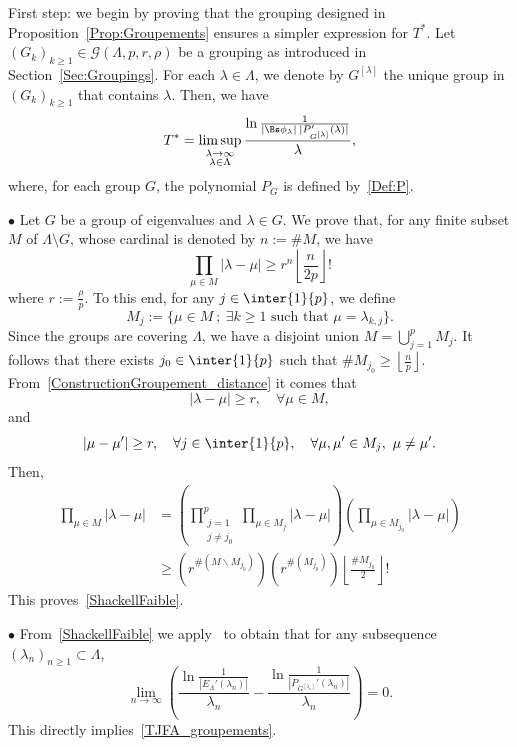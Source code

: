 \begin{proofc}
\begin{step}{First step:}
we begin by proving that the grouping designed in Proposition~\ref{Prop:Groupements} ensures a simpler expression for $T^*$. Let $(G_k)_{k \geq 1}\in \mathcal{G}(\Lambda,p,r,\rho)$ be a grouping as introduced in Section~\ref{Sec:Groupings}. For each $\lambda\in \Lambda$, we denote by $G^{[\lambda]}$ the unique group in $(G_k)_{k\geq 1}$ that contains $\lambda$. Then, we have
\begin{equation}\label{TJFA_groupements}
T^*=\limsup_{\substack{\lambda\to \infty\\ \lambda\in \Lambda}} \frac{\ln \frac{1}{| \Bs\phi_\lambda | \: | P_{G^{[\lambda]}}' (\lambda) |}}{ \lambda },
\end{equation}
where, for each group $G$, the polynomial $P_G$ is defined by~\eqref{Def:P}.


\noindent $\bullet$ Let $G$ be a group of eigenvalues and $\lambda \in G$. We prove that, for any finite subset $M$ of $\Lambda\setminus G$, whose cardinal is denoted by $n:=\# M$, we have
\begin{equation}\label{ShackellFaible}
\prod_{\mu \in M} |\lambda- \mu| \geq r^n \left\lfloor \frac{n}{2p} \right\rfloor !
\end{equation}
where $r:= \frac{\rho}{p}$. To this end, for any $j \in \inter{1}{p}$, we define
\[
M_j := \{ \mu\in M \: ; \: \exists k \geq 1 \text{ such that } \mu = \lambda_{k,j} \}.
\]
Since the groups are covering $\Lambda$, we have a disjoint union $M = \displaystyle\bigcup_{j=1}^p M_j$. It follows that there exists $j_0 \in \inter{1}{p}$ such that $\# M_{j_0} \geq \left\lfloor \frac{n}{p} \right\rfloor$. From~\eqref{ConstructionGroupement_distance} it comes that
\[
|\lambda - \mu | \geq r, \quad \forall \mu \in M,
\]
and
\[
|\mu - \mu'| \geq r, \quad \forall j \in \inter{1}{p},\quad\forall \mu, \mu' \in M_j, \ \mu\neq \mu'.
\]
Then,
\begin{align*}
\prod_{\mu \in M} |\lambda- \mu| &= \left(\prod_{\substack{j=1 \\ j \neq j_0}}^p \prod_{\mu \in M_j} |\lambda-\mu| \right) \left(\prod_{\mu \in M_{j_0}} |\lambda-\mu|\right)
\\
&\geq \left(r^{\# (M\backslash M_{j_0})} \right) \left(r^{\# (M_{j_0})}\right) \left\lfloor \frac{\#M_{j_0}}{2} \right\rfloor!
\end{align*}
This proves~\eqref{ShackellFaible}.

\medskip
\noindent $\bullet$ From~\eqref{ShackellFaible} we apply~\cite[Theorem~3.8]{AmmarKhodjaBenabdallahGonzalez-BurgosdeTeresa:2014} to obtain that for any subsequence $(\lambda_n)_{n \geq 1} \subset \Lambda$,
\begin{equation}\label{JFA_Th3.8}
\lim_{n \to \infty} \left(\frac{\ln \frac{1}{|E_\Lambda'(\lambda_n)|}}{\lambda_n} - \frac{\ln \frac{1}{|P_{G^{[\lambda_n]}}'(\lambda_n)|}}{\lambda_n} \right) = 0.
\end{equation}
This directly implies~\eqref{TJFA_groupements}.


\end{step}
\end{proofc}
